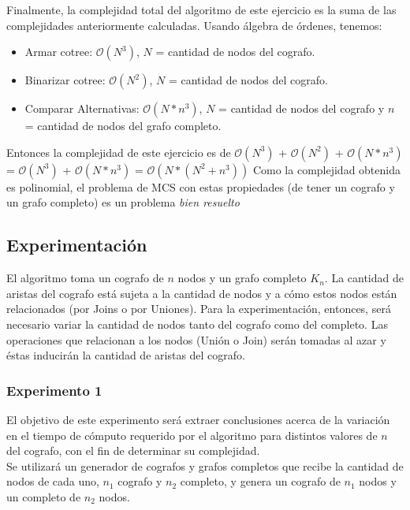 Finalmente, la complejidad total del algoritmo de este ejercicio es la suma de las complejidades anteriormente calculadas. Usando álgebra de órdenes, tenemos:
\begin{itemize}
	\item Armar cotree: $\mathcal{O}(N^3)$, $N$ = cantidad de nodos del cografo.
    \item Binarizar cotree: $\mathcal{O}(N^2)$, $N$ = cantidad de nodos del cografo.
    \item Comparar Alternativas: $\mathcal{O}(N*n^3)$, $N$ = cantidad de nodos del cografo y $n$ = cantidad de nodos del grafo completo.
\end{itemize}
Entonces la complejidad de este ejercicio es de $\mathcal{O}(N^3)$ + $\mathcal{O}(N^2)$ + $\mathcal{O}(N*n^3)$ = $\mathcal{O}(N^3)$ + $\mathcal{O}(N*n^3)$ = $\mathcal{O}(N*(N^2+n^3))$
Como la complejidad obtenida es polinomial, el problema de MCS con estas propiedades (de tener un cografo y un grafo completo) es un problema \textit{bien resuelto}

\subsection{Experimentación}
\noindent El algoritmo toma un cografo de $n$ nodos y un grafo completo $K_n$. La cantidad de aristas del cografo está sujeta a la cantidad de nodos y a cómo estos nodos están relacionados (por Joins o por Uniones). Para la experimentación, entonces, será necesario variar la cantidad de nodos tanto del cografo como del completo. Las operaciones que relacionan a los nodos (Unión o Join) serán tomadas al azar y éstas inducirán la cantidad de aristas del cografo.\\


		\subsubsection*{Experimento 1}\; 
        \noindent  El objetivo de este experimento será extraer conclusiones acerca de la variación en el tiempo de cómputo requerido por el algoritmo para distintos valores de $n$ del cografo, con el fin de determinar su complejidad. \\
   Se utilizará un generador de cografos y grafos completos que recibe la cantidad de nodos de cada uno, $n_1$ cografo y $n_2$ completo, y genera un cografo de $n_1$ nodos y un completo de $n_2$ nodos.

